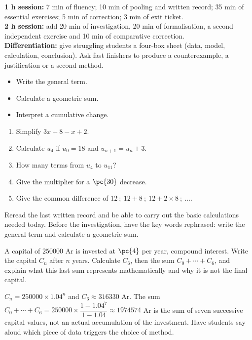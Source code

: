     \ifmxteacher
    \begin{method}
    \textbf{1 h session:} 7 min of fluency; 10 min of pooling and written record; 35 min of essential exercises; 5 min of correction; 3 min of exit ticket.\\
    \textbf{2 h session:} add 20 min of investigation, 20 min of formalisation, a second independent exercise and 10 min of comparative correction.\\
    \textbf{Differentiation:} give struggling students a four-box sheet (data, model, calculation, conclusion). Ask fast finishers to produce a counterexample, a justification or a second method.
    \end{method}
    \fi
{}
\begin{objectives}\begin{itemize}\item Write the general term.\item Calculate a geometric sum.\item Interpret a cumulative change.\end{itemize}\end{objectives}
\begin{fluency}\begin{enumerate}\item Simplify $3x+8-x+2$. \item Calculate $u_4$ if $u_0=18$ and $u_{n+1}=u_n+3$. \item How many terms from $u_{4}$ to $u_{11}$? \item Give the multiplier for a $\pc{30}$ decrease. \item Give the common difference of $12\ ;\ 12+8\ ;\ 12+2\times8\ ;\ \ldots$. \end{enumerate}\end{fluency}
\begin{prerequisites}Reread the last written record and be able to carry out the basic calculations needed today. Before the investigation, have the key words rephrased: write the general term and calculate a geometric sum.\end{prerequisites}

\begin{activity}
A capital of $\num{250000}$ Ar is invested at $\pc{4}$ per year, compound interest. Write the capital $C_n$ after $n$ years. Calculate $C_6$, then the sum $C_0+\cdots+C_6$, and explain what this last sum represents mathematically and why it is not the final capital.

\end{activity}
\begin{solution}$C_n=\num{250000}\times\num{1,04}^n$ and $C_6\approx\num{316330}$ Ar. The sum $C_0+\cdots+C_6=\num{250000}\times\dfrac{1-\num{1,04}^7}{1-\num{1,04}}\approx\num{1974574}$ Ar is the sum of seven successive capital values, not an actual accumulation of the investment. Have students say aloud which piece of data triggers the choice of method.\end{solution}

